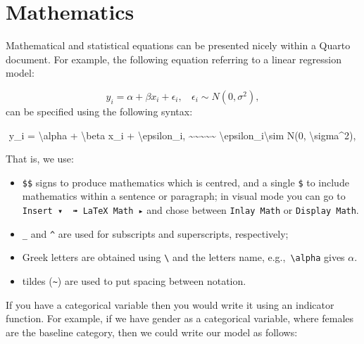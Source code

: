\documentclass[
  letterpaper,
  DIV=11,
  numbers=noendperiod]{scrartcl}
\newenvironment{Shaded}{\begin{snugshade}}{\end{snugshade}}
\newcommand{\SpecialCharTok}[1]{\textcolor[rgb]{0.37,0.37,0.37}{#1}}
\newcommand{\SpecialStringTok}[1]{\textcolor[rgb]{0.13,0.47,0.30}{#1}}
\providecommand{\tightlist}{%
  \setlength{\itemsep}{0pt}\setlength{\parskip}{0pt}}\usepackage{longtable,booktabs,array}
\begin{document}
\section{Mathematics}\label{mathematics}

Mathematical and statistical equations can be presented nicely within a
Quarto document. For example, the following equation referring to a
linear regression model:

\[y_i = \alpha + \beta x_i + \epsilon_i, ~~~~ \epsilon_i \sim N(0, \sigma^2),\]
can be specified using the following syntax:

\begin{Shaded}
\begin{Highlighting}[]
\SpecialStringTok{$$ }
\SpecialStringTok{y\_i = }\SpecialCharTok{\textbackslash{}alpha}\SpecialStringTok{ + }\SpecialCharTok{\textbackslash{}beta}\SpecialStringTok{ x\_i + }\SpecialCharTok{\textbackslash{}epsilon}\SpecialStringTok{\_i, \textasciitilde{}\textasciitilde{}\textasciitilde{}\textasciitilde{}\textasciitilde{} }\SpecialCharTok{\textbackslash{}\textasciigrave{}}\SpecialStringTok{\textasciigrave{}epsilon\_i\textasciigrave{}\textasciigrave{}}\SpecialCharTok{\textbackslash{}sim}\SpecialStringTok{ N(0, }\SpecialCharTok{\textbackslash{}sigma}\SpecialStringTok{\^{}2), $$}
\end{Highlighting}
\end{Shaded}

That is, we use:

\begin{itemize}
\tightlist
\item
  \texttt{\$\$} signs to produce mathematics which is centred, and a
  single \texttt{\$} to include mathematics within a sentence or
  paragraph; in visual mode you can go to
  \texttt{Insert\ ▾\ \ ➠\ LaTeX\ Math\ ▸} and chose between
  \texttt{Inlay\ Math} or \texttt{Display\ Math}.
\item
  \texttt{\_} and \texttt{\^{}} are used for subscripts and
  superscripts, respectively;
\item
  Greek letters are obtained using \texttt{\textbackslash{}} and the
  letters name, e.g.,~\texttt{\textbackslash{}alpha} gives \(\alpha\).
\item
  tildes (\texttt{\textasciitilde{}}) are used to put spacing between
  notation.
\end{itemize}

If you have a categorical variable then you would write it using an
indicator function. For example, if we have gender as a categorical
variable, where females are the baseline category, then we could write
our model as follows:
\end{document}
